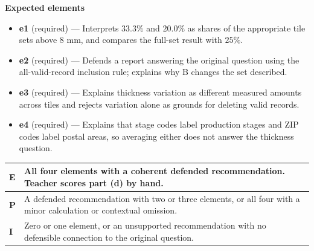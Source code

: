 \documentclass[11pt]{article}
\begin{document}

\textbf{Expected elements}
\begin{itemize}[leftmargin=1.5em,itemsep=2pt,topsep=2pt]
  \item \textbf{e1} (required) --- Interprets $33.3\%$ and $20.0\%$ as shares of the appropriate tile sets above 8 mm, and compares the full-set result with $25\%$.
  \item \textbf{e2} (required) --- Defends a report answering the original question using the all-valid-record inclusion rule; explains why B changes the set described.
  \item \textbf{e3} (required) --- Explains thickness variation as different measured amounts across tiles and rejects variation alone as grounds for deleting valid records.
  \item \textbf{e4} (required) --- Explains that stage codes label production stages and ZIP codes label postal areas, so averaging either does not answer the thickness question.
\end{itemize}

{\small\renewcommand{\arraystretch}{1.25}
\noindent\begin{tabular}{|p{0.5in}|p{5.9in}|}
\hline
\textbf{E} & All four elements with a coherent defended recommendation. Teacher scores part (d) by hand. \\ \hline
\textbf{P} & A defended recommendation with two or three elements, or all four with a minor calculation or contextual omission. \\ \hline
\textbf{I} & Zero or one element, or an unsupported recommendation with no defensible connection to the original question. \\ \hline
\end{tabular}}

\clearpage
\normalsize
{}
\end{document}
